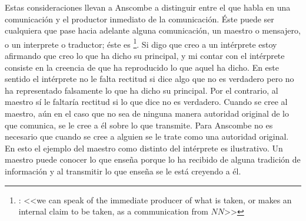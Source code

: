 Estas consideraciones llevan a Anscombe a distinguir entre el que habla en una comunicación y el productor inmediato de la comunicación\autocite[Cf.~][8]{anscombe2008faith:tobelieve}. Éste puede ser cualquiera que pase hacia adelante alguna comunicación, un maestro o mensajero, o un interprete o traductor; éste es \footnote{\cite[8]{anscombe2008faith:tobelieve}: <<we can speak of the immediate producer of what is taken, or makes an internal claim to be taken, as a communication from $NN$>>}. Si digo que creo a un intérprete estoy afirmando que creo lo que ha dicho su principal, y mi contar con el intérprete consiste en la creencia de que ha reproducido lo que aquel ha dicho. En este sentido el intérprete no le falta rectitud si dice algo que no es verdadero pero no ha representado falsamente lo que ha dicho su principal. Por el contrario, al maestro sí le faltaría rectitud si lo que dice no es verdadero. Cuando se cree al maestro, aún en el caso que no sea de ninguna manera autoridad original de lo que comunica, se le cree a él sobre lo que transmite. Para Anscombe no es necesario que cuando se cree a alguien se le trate como una autoridad original\autocite[Cf.~][5]{anscombe2008faith:tobelieve}. En esto el ejemplo del maestro como distinto del intérprete es ilustrativo. Un maestro puede conocer lo que enseña porque lo ha recibido de alguna tradición de información y al transmitir lo que enseña se le está creyendo a él.

